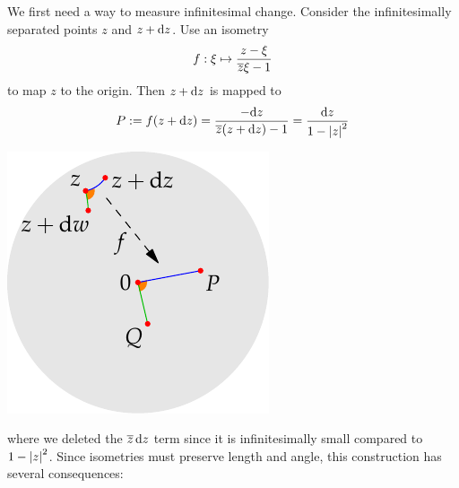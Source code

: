 \begin{minipage}[t]{0.69\linewidth}\vspace{0pt}
We first need a way to measure infinitesimal change. Consider the infinitesimally separated points $z$ and $z+{\mathrm{d} z}$. Use an isometry
\[f:\xi\mapsto \frac{z-\xi}{\overline{z}\xi-1}\]
to map $z$ to the origin. Then $z+{\mathrm{d} z}$ is mapped to
\[P:=f(z+{\mathrm{d} z})=\frac{-{\mathrm{d} z}}{\overline{z}(z+{\mathrm{d} z})-1} =\frac{{\mathrm{d} z}}{1-\left| z\right|^2}\]
\end{minipage}\begin{minipage}[t]{0.31\linewidth}\vspace{-15pt}
\flushright\includegraphics{isom-arclength}
\end{minipage}\par
where we deleted the $\overline{z}\,{\mathrm{d} z}$ term since it is infinitesimally small compared to $1-\left| z\right|^2$.\smallbreak
Since isometries must preserve length and angle, this construction has several consequences:
